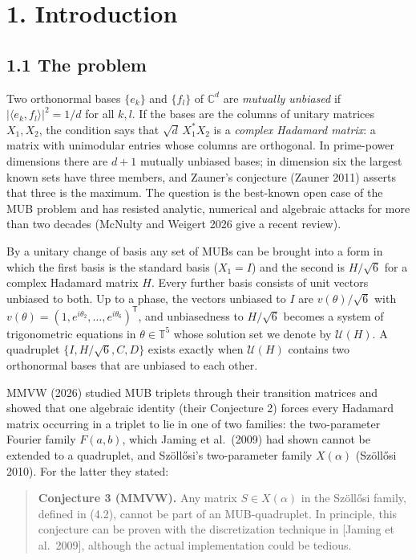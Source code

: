 \documentclass[
  11pt,
]{article}
\begin{document}
\section{1. Introduction}\label{introduction}

\subsection{1.1 The problem}\label{the-problem}

Two orthonormal bases \(\{e_k\}\) and \(\{f_l\}\) of \(\mathbb C^d\) are
\emph{mutually unbiased} if \(|\langle e_k,f_l\rangle|^2=1/d\) for all
\(k,l\). If the bases are the columns of unitary matrices \(X_1,X_2\),
the condition says that \(\sqrt d\,X_1^*X_2\) is a \emph{complex
Hadamard matrix}: a matrix with unimodular entries whose columns are
orthogonal. In prime-power dimensions there are \(d+1\) mutually
unbiased bases; in dimension six the largest known sets have three
members, and Zauner's conjecture (Zauner 2011) asserts that three is the
maximum. The question is the best-known open case of the MUB problem and
has resisted analytic, numerical and algebraic attacks for more than two
decades (McNulty and Weigert 2026 give a recent review).

By a unitary change of basis any set of MUBs can be brought into a form
in which the first basis is the standard basis (\(X_1=I\)) and the
second is \(H/\sqrt6\) for a complex Hadamard matrix \(H\). Every
further basis consists of unit vectors unbiased to both. Up to a phase,
the vectors unbiased to \(I\) are \(v(\theta)/\sqrt6\) with
\(v(\theta)=(1,e^{i\theta_2},\dots,e^{i\theta_6})^{\mathsf T}\), and
unbiasedness to \(H/\sqrt6\) becomes a system of trigonometric equations
in \(\theta\in\mathbb T^5\) whose solution set we denote by
\(\mathcal U(H)\). A quadruplet \(\{I,H/\sqrt6,C,D\}\) exists exactly
when \(\mathcal U(H)\) contains two orthonormal bases that are unbiased
to each other.

MMVW (2026) studied MUB triplets through their transition matrices and
showed that one algebraic identity (their Conjecture 2) forces every
Hadamard matrix occurring in a triplet to lie in one of two families:
the two-parameter Fourier family \(F(a,b)\), which Jaming et al.~(2009)
had shown cannot be extended to a quadruplet, and Szöllősi's
two-parameter family \(X(\alpha)\) (Szöllősi 2010). For the latter they
stated:

\begin{quote}
\textbf{Conjecture 3 (MMVW).} Any matrix \(S\in X(\alpha)\) in the
Szöllősi family, defined in (4.2), cannot be part of an MUB-quadruplet.
In principle, this conjecture can be proven with the discretization
technique in {[}Jaming et al.~2009{]}, although the actual
implementation could be tedious.
\end{quote}
\end{document}
